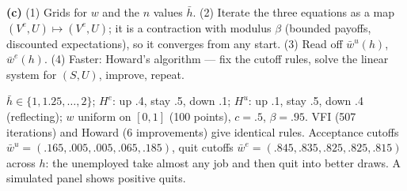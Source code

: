 \documentclass[12pt, letterpaper]{article}
\newcommand{\wb}{\bar w}
\begin{document}
\begin{tcolorbox}[evenbox,title={Exercise 6.24 \quad Human Capital}]
\textbf{(c)} (1) Grids for $w$ and the $n$ values $\bar h$. (2) Iterate the three equations as a map
$(V^e,U)\mapsto(V^e,U)$; it is a contraction with modulus $\beta$ (bounded payoffs, discounted
expectations), so it converges from any start. (3) Read off $\wb^u(h)$, $\wb^e(h)$. (4) Faster: Howard's
algorithm --- fix the cutoff rules, solve the linear system for $(S,U)$, improve, repeat.

\begin{tcolorbox}[databox]
$\bar h\in\{1,1.25,\dots,2\}$; $H^e$: up .4, stay .5, down .1; $H^u$: up .1, stay .5, down .4 (reflecting); $w$ uniform on $[0,1]$
(100 points), $c=.5$, $\beta=.95$. VFI (507 iterations) and Howard (6 improvements) give identical rules.
Acceptance cutoffs $\wb^u=(.165,.005,.005,.065,.185)$, quit cutoffs $\wb^e=(.845,.835,.825,.825,.815)$ across $h$:
the unemployed take almost any job and then quit into better draws. A simulated panel shows positive quits.
\end{tcolorbox}
\end{tcolorbox}
\end{document}
